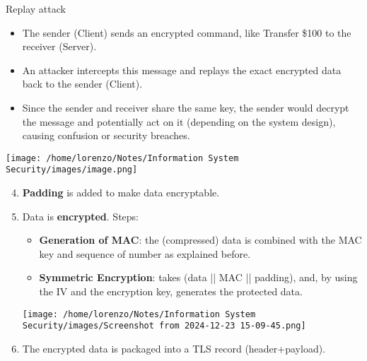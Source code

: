 \begin{quotebox-grey}{Replay attack}
    \begin{minipage}{0.6\textwidth}
    \begin{itemize}
        \item The sender (Client) sends an encrypted command, like Transfer \$100 to the receiver (Server).
        \item An attacker intercepts this message and replays the exact encrypted data back to the sender (Client).
        \item Since the sender and receiver share the same key, the sender would decrypt the message and potentially act on it (depending on the system design), causing confusion or security breaches.
    \end{itemize}
    
    \end{minipage} 
    \hspace{0.3cm}
    \begin{minipage}{0.4\textwidth}
        \centering
        \texttt{[image: /home/lorenzo/Notes/Information System Security/images/image.png]}
    \end{minipage}

\end{quotebox-grey}
\begin{enumerate}
\setcounter{enumi}{3}
\item \textbf{Padding} is added to make data 
encryptable.
\item Data is \textbf{encrypted}. Steps:
\\
\begin{minipage}{0.5\textwidth}
	
\begin{itemize}
    \vspace{-1cm}
    \item \textbf{Generation of MAC}: the (compressed) data is combined with the MAC key and sequence of number as explained before. 
    \item \textbf{Symmetric Encryption}: takes (data || MAC || padding), and, by using the IV and the encryption key, generates the protected data.
\end{itemize}
\end{minipage} 
\hspace{0.5cm}
\begin{minipage}{0.4\textwidth}
    \centering
    \texttt{[image: /home/lorenzo/Notes/Information System Security/images/Screenshot from 2024-12-23 15-09-45.png]}
\end{minipage}

\item The encrypted data is packaged into a TLS record (header+payload).
\end{enumerate}

